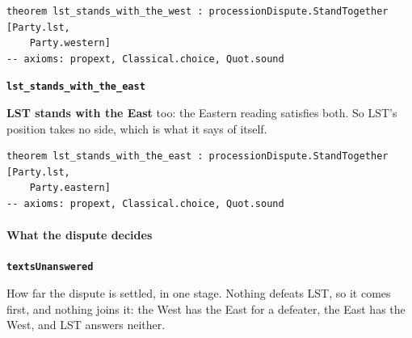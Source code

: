 \documentclass[11pt,paper=\testimonypaper,DIV=13,parskip=false]{scrartcl}
\begin{document}
{\small\begin{verbatim}
theorem lst_stands_with_the_west : processionDispute.StandTogether [Party.lst,
    Party.western]
-- axioms: propext, Classical.choice, Quot.sound
\end{verbatim}}
\par\medskip\noindent\textbf{\texttt{lst\_\allowbreak{}stands\_\allowbreak{}with\_\allowbreak{}the\_\allowbreak{}east}}\par\nobreak\noindent
\textbf{LST stands with the East} too: the Eastern reading satisfies both. So LST’s position takes no side, which is what it says of itself.

{\small\begin{verbatim}
theorem lst_stands_with_the_east : processionDispute.StandTogether [Party.lst,
    Party.eastern]
-- axioms: propext, Classical.choice, Quot.sound
\end{verbatim}}
\paragraph*{What the dispute decides}
\leavevmode\par\nobreak
\par\medskip\noindent\textbf{\texttt{texts\allowbreak{}Unanswered}}\par\nobreak\noindent
How far the dispute is settled, in one stage. Nothing defeats LST, so it comes first, and nothing joins it: the West has the East for a defeater, the East has the West, and LST answers neither.
\end{document}
